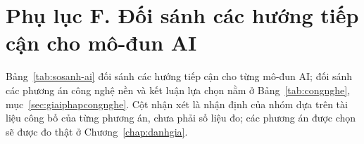 
\section*{Phụ lục F. Đối sánh các hướng tiếp cận cho mô-đun AI}
\label{apdx:congnghe}

Bảng~\ref{tab:sosanh-ai} đối sánh các hướng tiếp cận cho từng mô-đun AI; đối sánh các
phương án công nghệ nền và kết luận lựa chọn nằm ở Bảng~\ref{tab:congnghe}, mục~\ref{sec:giaiphapcongnghe}.
Cột nhận xét là nhận định của nhóm dựa trên tài liệu công bố của từng phương án,
chưa phải số liệu đo; các phương án được chọn sẽ được đo thật ở Chương~\ref{chap:danhgia}.

